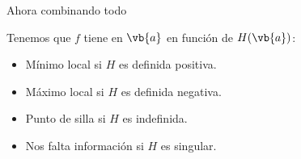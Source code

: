 \documentclass{../Calculo.tex}
\begin{document}
Ahora combinando todo
\begin{teorema}
Tenemos que $f$ tiene en $\vb{a}$ en función de $H(\vb{a})$:  
\begin{itemize}
	\item Mínimo local si $H$ es definida positiva.
	\item Máximo local si $H$ es definida negativa.
	\item Punto de silla si $H$ es indefinida.
	\item Nos falta información si $H$ es singular. 
\end{itemize}

\end{teorema}
\end{document}
